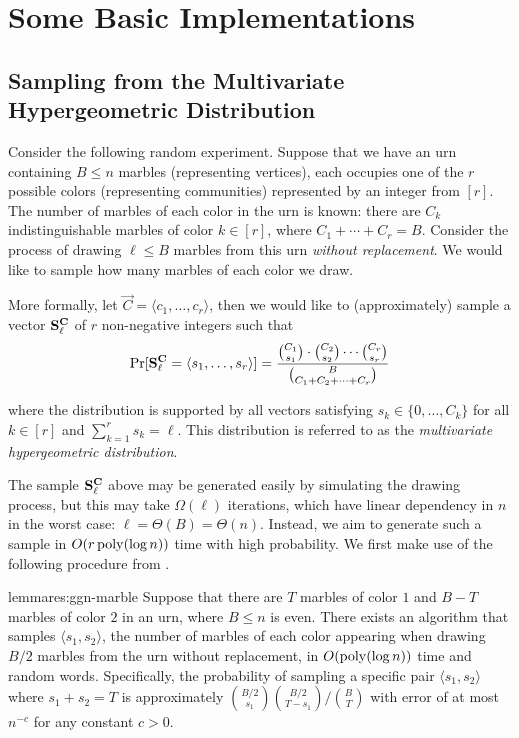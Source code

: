 \section{Some Basic Implementations}%
\label{sec:building_blocks}

\subsection{Sampling from the Multivariate Hypergeometric Distribution}
\label{sec:multivariate_hypergeometric_sampling}

Consider the following random experiment. Suppose that we have an urn containing $B \leq n$ marbles (representing vertices), each occupies one of the $r$ possible colors (representing communities) represented by an integer from $[r]$. The number of marbles of each color in the urn is known: there are $C_k$ indistinguishable marbles of color $k \in [r]$, where $C_1 + \cdots + C_r = B$. Consider the process of drawing $\ell \leq B$ marbles from this urn \emph{without replacement}. We would like to sample how many marbles of each color we draw.

More formally, let $\vec{C} = \langle c_1, \ldots, c_r \rangle$, then we would like to (approximately) sample a vector $\mathbf{S}^{\mathbf{C}}_\ell$ of $r$ non-negative integers such that
\[\Pr[\mathbf{S}^{\mathbf{C}}_\ell = \langle s_1, \ldots, s_r \rangle]
= \frac{{C_1\choose s_1}\cdot{C_2\choose s_2}\cdots{C_r\choose s_r}}{{B \choose C_1+C_2+ \cdots +C_r}}\]

where the distribution is supported by all vectors satisfying $s_k \in \{0, \ldots, C_k\}$ for all $k \in [r]$ and $\sum_{k=1}^{r} s_k = \ell$. This distribution is referred to as the \emph{multivariate hypergeometric distribution}.

The sample $\mathbf{S}^{\mathbf{C}}_\ell$ above may be generated easily by simulating the drawing process, but this may take $\Omega(\ell)$ iterations, which have linear dependency in $n$ in the worst case: $\ell = \Theta(B) = \Theta(n)$. Instead, we aim to generate such a sample in $O(r\,\mathrm{poly}(\log n))$ time with high probability. We first make use of the following procedure from \cite{huge}.

\begin{restatable}{lemma}{res:ggn-marble}\label{claim:ggn}
Suppose that there are $T$ marbles of color $1$ and $B-T$ marbles of color $2$ in an urn,
where $B \leq n$ is even. There exists an algorithm that samples $\langle s_1, s_2 \rangle$,
the number of marbles of each color appearing when drawing $B/2$ marbles from the urn without replacement,
in $O(\mathrm{poly}(\log n))$ time and random words.
Specifically, the probability of sampling a specific pair $\langle s_1, s_2 \rangle$ where $s_1 + s_2 = T$
is approximately ${B/2 \choose s_1}{B/2 \choose T-s_1}/{B \choose T}$ with error of at most $n^{-c}$ for any constant $c>0$.
\end{restatable}


